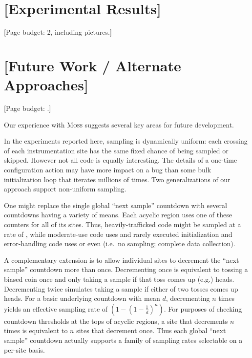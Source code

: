 \documentclass{acm_proc_article-sp}
\newcommand{\moss}{\textsc{Moss}\xspace}
\newcommand{\placeholder}[1]{{\color[cmyk]{0,0.61,0.87,0}[#1]}}
\begin{document}


\section{\placeholder{Experimental Results}}
\label{sec:experiments:results}
\placeholder{Page budget: 2, including pictures.}


\section{\placeholder{Future Work / Alternate Approaches}}
\label{sec:future-work}

\placeholder{Page budget: .}

Our experience with \moss suggests several key areas for future
development.

In the experiments reported here, sampling is dynamically uniform:
each crossing of each instrumentation site has the same fixed chance
of being sampled or skipped.  However not all code is equally
interesting.  The details of a one-time configuration action may have
more impact on a bug than some bulk initialization loop that iterates
millions of times.  Two generalizations of our approach support
non-uniform sampling.

One might replace the single global ``next sample'' countdown with
several countdowns having a variety of means.  Each acyclic region
uses one of these counters for all of its sites.  Thus,
heavily-trafficked code might be sampled at a rate of
, while moderate-use code uses  and
rarely executed initialization and error-handling code uses
 or even  (i.e.\ no sampling; complete
data collection).

A complementary extension is to allow individual sites to decrement
the ``next sample'' countdown more than once.  Decrementing once is
equivalent to tossing a biased coin once and only taking a sample if
that toss comes up (e.g.) heads.  Decrementing twice simulates taking
a sample if either of two tosses comes up heads.  For a basic
underlying countdown with mean $d$, decrementing $n$ times yields an
effective sampling rate of $(1 - (1 - \frac{1}{d})^n)$.  For purposes
of checking countdown thresholds at the tops of acyclic regions, a
site that decrements $n$ times is equivalent to $n$ sites that
decrement once.  Thus each global ``next sample'' countdown actually
supports a family of sampling rates selectable on a per-site basis.
\end{document}
